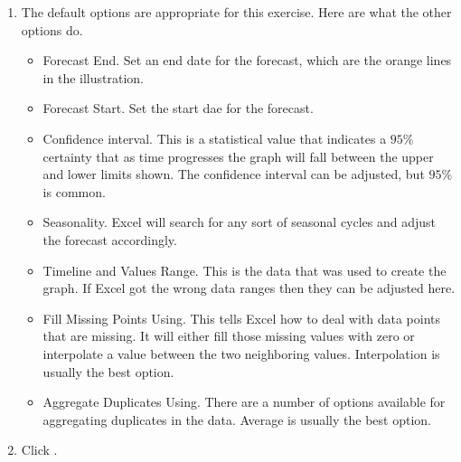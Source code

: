 \begin{enumerate}[resume]
	
	\item The default options are appropriate for this exercise. Here are what the other options do.
	
	\begin{itemize}
		\item Forecast End. Set an end date for the forecast, which are the orange lines in the illustration.
		\item Forecast Start. Set the start dae for the forecast.
		\item Confidence interval. This is a statistical value that indicates a $ 95 $\% certainty that as time progresses the graph will fall between the upper and lower limits shown. The confidence interval can be adjusted, but $ 95 $\% is common.
		\item Seasonality. Excel will search for any sort of seasonal cycles and adjust the forecast accordingly.
		\item Timeline and Values Range. This is the data that was used to create the graph. If Excel got the wrong data ranges then they can be adjusted here.
		\item Fill Missing Points Using. This tells Excel how to deal with data points that are missing. It will either fill those missing values with zero or interpolate a value between the two neighboring values. Interpolation is usually the best option.
		\item Aggregate Duplicates Using. There are a number of options available for aggregating duplicates in the data. Average is usually the best option.
	\end{itemize}	
	
	\item Click .

\end{enumerate}

